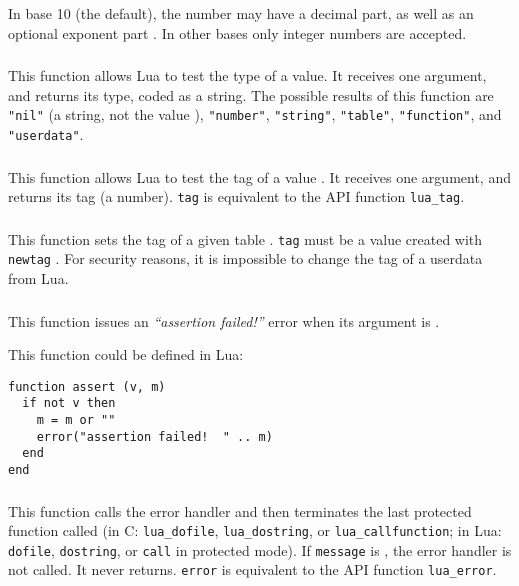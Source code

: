 In base 10 (the default), the number may have a decimal part,
as well as an optional exponent part .
In other bases only integer numbers are accepted.

\subsubsection*{\ff {}}\label{pdf-type}
This function allows Lua to test the type of a value.
It receives one argument, and returns its type, coded as a string.
The possible results of this function are
\verb|"nil"| (a string, not the value \nil),
\verb|"number"|,
\verb|"string"|,
\verb|"table"|,
\verb|"function"|,
and \verb|"userdata"|.

\subsubsection*{\ff {}}
This function allows Lua to test the tag of a value .
It receives one argument, and returns its tag (a number).
\verb|tag| is equivalent to the API function \verb|lua_tag|.

\subsubsection*{\ff {}}
This function sets the tag of a given table .
\verb|tag| must be a value created with \verb|newtag|
.
For security reasons,
it is impossible to change the tag of a userdata from Lua.

\subsubsection*{\ff {}}
This function issues an \emph{``assertion failed!''} error
when its argument is \nil.

This function could be defined in Lua:
\begin{verbatim}
function assert (v, m)
  if not v then
    m = m or ""
    error("assertion failed!  " .. m)
  end
end
\end{verbatim}

\subsubsection*{\ff {}}\label{pdf-error}
This function calls the error handler and then terminates
the last protected function called
(in C: \verb|lua_dofile|, \verb|lua_dostring|, or \verb|lua_callfunction|;
in Lua: \verb|dofile|, \verb|dostring|, or \verb|call| in protected mode).
If \verb|message| is \nil, the error handler is not called.
It never returns.
\verb|error| is equivalent to the API function \verb|lua_error|.

